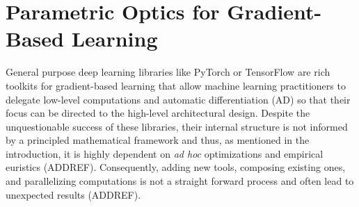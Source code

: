 \documentclass[12pt,a4paper,openright,twoside]{report}
\theoremstyle{plain}
\theoremstyle{definition}
\begin{document}
\tableofcontents
\rhead[\fancyplain{}{\bfseries\leftmark}]{\fancyplain{}{\bfseries\thepage}} 
\clearpage{\pagestyle{empty}\cleardoublepage}

























































\chapter{Parametric Optics for Gradient-Based Learning}

\lhead[\fancyplain{}{\bfseries\thepage}]{\fancyplain{}{\bfseries\rightmark}}




General purpose deep learning libraries like PyTorch or TensorFlow are rich toolkits for gradient-based learning that allow machine learning practitioners to delegate low-level computations and automatic differentiation (AD) so that their focus can be directed to the high-level architectural design. Despite the unquestionable success of these libraries, their internal structure is not informed by a principled mathematical framework and thus, as mentioned in the introduction, it is highly dependent on \textit{ad hoc} optimizations and empirical euristics (ADDREF). Consequently, adding new tools, composing existing ones, and parallelizing computations is not a straight forward process and often lead to unexpected results (ADDREF).
\end{document}
